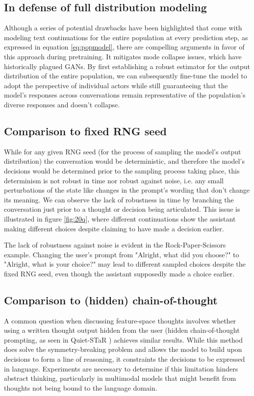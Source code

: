 \documentclass{article}
\begin{document}
\subsection{In defense of full distribution modeling}
Although a series of potential drawbacks have been highlighted that come with modeling text continuations for the entire population at every prediction step, as expressed in equation \ref{eq:popmodel}, there are compelling arguments in favor of this approach during pretraining. It mitigates mode collapse issues, which have historically plagued GANs. By first establishing a robust estimator for the output distribution of the entire population, we can subsequently fine-tune the model to adopt the perspective of individual actors while still guaranteeing that the model's responses across conversations remain representative of the population's diverse responses and doesn't collapse. 

\subsection{Comparison to fixed RNG seed}
While for any given RNG seed (for the process of sampling the model's output distribution) the conversation would be deterministic, and therefore the model's decisions would be determined prior to the sampling process taking place, this determinism is not robust in time nor robust against noise, i.e. any small perturbations of the state like changes in the prompt's wording that don't change its meaning. We can observe the lack of robustness in time by branching the conversation just prior to a thought or decision being articulated. 
This issue is illustrated in figure \ref{fig:20q}, where different continuations show the assistant making different choices despite claiming to have made a decision earlier.

The lack of robustness against noise is evident in the Rock-Paper-Scissors example. Changing the user's prompt from "Alright, what did you choose?" to "Alright, what is your choice?" may lead to different sampled choices despite the fixed RNG seed, even though the assistant supposedly made a choice earlier.

\subsection{Comparison to (hidden) chain-of-thought}
A common question when discussing feature-space thoughts involves whether using a written thought output hidden from the user (hidden chain-of-thought prompting, as seen in Quiet-STaR \cite{zelikman2024quietstar}) achieves similar results. 
While this method does solve the symmetry-breaking problem and allows the model to build upon decisions to form a line of reasoning, it constraints the decisions to be expressed in language. Experiments are necessary to determine if this limitation hinders abstract thinking, particularly in multimodal models that might benefit from thoughts not being bound to the language domain.
\end{document}

